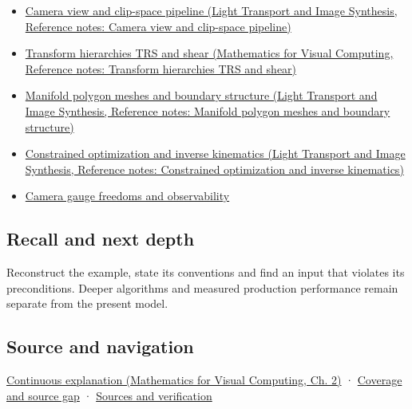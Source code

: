 \begin{itemize}
\item
  \href{../04-Light-Transport-and-Image-Synthesis/main.pdf\#nameddest=appendix-1c07d64f5e70}{Camera view and clip-space pipeline (Light Transport and Image Synthesis, Reference notes: Camera view and clip-space pipeline)}
\item
  \href{../02-Mathematics-for-Visual-Computing/main.pdf\#nameddest=appendix-292c061cd47c}{Transform hierarchies TRS and shear (Mathematics for Visual Computing, Reference notes: Transform hierarchies TRS and shear)}
\item
  \href{../04-Light-Transport-and-Image-Synthesis/main.pdf\#nameddest=appendix-fab348609369}{Manifold polygon meshes and boundary structure (Light Transport and Image Synthesis, Reference notes: Manifold polygon meshes and boundary structure)}
\item
  \href{../04-Light-Transport-and-Image-Synthesis/main.pdf\#nameddest=appendix-29f4bea4c2bb}{Constrained optimization and inverse kinematics (Light Transport and Image Synthesis, Reference notes: Constrained optimization and inverse kinematics)}
\item
  \hyperref[appendix-113f0267e5f4]{Camera gauge freedoms and observability}
\end{itemize}

\subsection{Recall and next depth}\label{appendix-1bae9457dbc3-recall-and-next-depth}

Reconstruct the example, state its conventions and find an input that violates its preconditions. Deeper algorithms and measured production performance remain separate from the present model.

\subsection{Source and navigation}\label{appendix-1bae9457dbc3-source-and-navigation}

\href{../02-Mathematics-for-Visual-Computing/main.pdf\#nameddest=01-foundations-i-ch018-keep-the-promises-visible-while-moving-between-representations}{Continuous explanation (Mathematics for Visual Computing, Ch. 2)} · \hyperref[appendix-fd090d982a15-phase-7---parts-601-700]{Coverage and source gap} · \hyperref[appendix-a103e7846d21-phase-7---source-analysis-and-verification]{Sources and verification}

